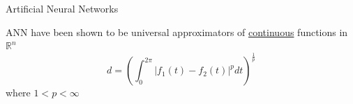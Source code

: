 \documentclass{beamer}
\begin{document}
\begin{frame}{Artificial Neural Networks}
\begin{minipage}[t]{0.5\textwidth}
  \centering{}
\end{minipage}\hfill
\begin{minipage}[t]{0.5\textwidth}
ANN have been shown to be universal approximators of \underline{continuous} functions in $\mathbb{R}^n$ \\
$$
d=\left(\int_0^{2\pi}|f_1(t)-f_2(t)|^p dt\right)^\frac{1}{p}
$$
where $1<p<\infty$
\end{minipage}
\end{frame}
\end{document}
